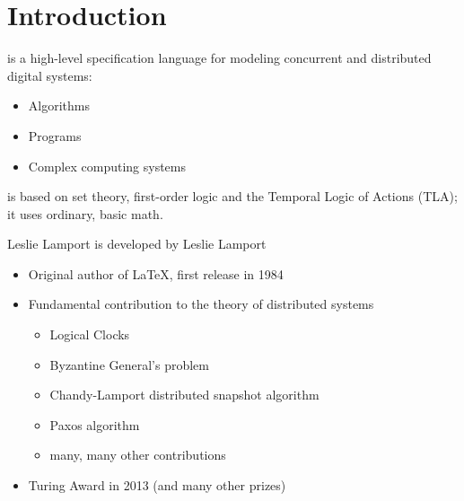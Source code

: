 \section[image=bgphoto_cut]{Introduction}
\begin{frame}[plain]{}
    \sectionpage
\end{frame}

\begin{frame}{\tlap}
    \tlap is a high-level specification language for modeling concurrent and distributed digital systems:
    \begin{itemize}
        \item Algorithms
        \item Programs
        \item Complex computing systems
    \end{itemize}

    \tlap is based on set theory, first-order logic and the Temporal Logic of Actions (TLA); it uses ordinary, basic math.
\end{frame}

\begin{frame}{Leslie Lamport}
    \tlap is developed by Leslie Lamport
    \begin{itemize}
        \item Original author of \LaTeX, first release in 1984
        \item Fundamental contribution to the theory of distributed systems
        \begin{itemize}
            \item Logical Clocks
            \item Byzantine General's problem
            \item Chandy-Lamport distributed snapshot algorithm
            \item Paxos algorithm
            \item many, many other contributions
        \end{itemize}
        \item Turing Award in 2013 (and many other prizes)
    \end{itemize}
\end{frame}


